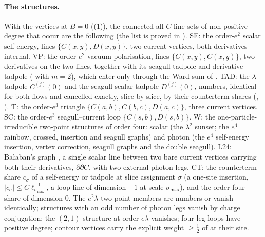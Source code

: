 \paragraph{The structures.}
With the vertices \cite[(3.18)--(3.23)]{K1} at $B=0$ ((1)), the connected all-$C$ line sets of non-positive degree that occur are the following (the list is proved in ). SE: the order-$e^2$ scalar self-energy, lines $\{C(x,y),D(x,y)\}$, two current vertices, both derivatives internal. VP: the order-$e^2$ vacuum polarisation, lines $\{C(x,y),C(x,y)\}$, two derivatives on the two lines, together with its seagull tadpole and derivative tadpole (\cite[(3.22)]{K1} with $m=2$), which enter only through the Ward sum of . TAD: the $\lambda$-tadpole $C^{(j)}(0)$ and the seagull scalar tadpole $D^{(j)}(0)$, numbers, identical for both flows and cancelled exactly, slice by slice, by their counterterm shares (\cite[(3.33)]{K1}, ). T: the order-$e^3$ triangle $\{C(a,b),C(b,c),D(a,c)\}$, three current vertices. SC: the order-$e^3$ seagull--current loop $\{C(s,b),D(s,b)\}$. W: the one-particle-irreducible two-point structures of order four: scalar (the $\lambda^2$ sunset; the $e^4$ rainbow, crossed, insertion and seagull graphs) and photon (the $e^4$ self-energy insertion, vertex correction, seagull graphs and the double seagull). L24: Ba{\l}aban's graph \cite[(2.4)]{Ba3}, a single scalar line between two bare current vertices carrying both their derivatives, $\partial\partial C$, with two external photon legs. CT: the counterterm share $c_\sigma$ of a self-energy or tadpole at slice assignment $\sigma$ (a one-site insertion, $|c_\sigma|\le C\ell_{\sigma_{\max}}^{-1}$, a loop line of dimension $-1$ at scale $\sigma_{\max}$), and the order-four share of dimension $0$. The $e^2\lambda$ two-point members are numbers or vanish identically; structures with an odd number of photon legs vanish by charge conjugation; the $(2,1)$-structure at order $e\lambda$ vanishes; four-leg loops have positive degree; contour vertices carry the explicit weight $\ge\frac12$ of \cite[(3.30)]{K1} at their site.

